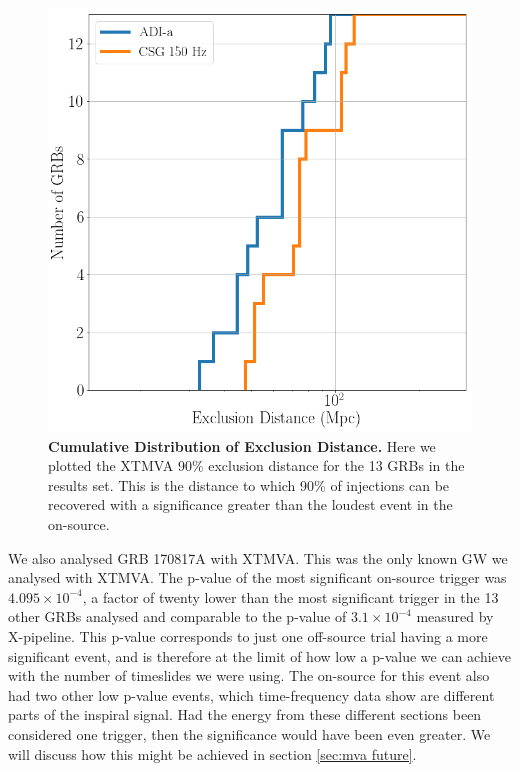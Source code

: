 \documentclass[11pt]{cuthesis}
\newcommand{\xpfs}{X-pipeline. }
\begin{document}
\begin{figure} %
\begin{center}
\includegraphics[width=0.8\linewidth]{mva_exclusion_plot.png}
\end{center}
\caption{\textbf{Cumulative Distribution of Exclusion Distance.} Here we plotted the XTMVA 90\% exclusion distance for the 13 GRBs in the results set. This is the distance to which 90\% of injections can be recovered with a significance greater than the loudest event in the on-source. }
\label{fig:mva exclusion plot}
\end{figure}

We also analysed GRB 170817A with XTMVA. This was the only known GW we analysed with XTMVA. The p-value of the most significant on-source trigger was $4.095\times10^{-4}$, a factor of twenty lower than the most significant trigger in the 13 other GRBs analysed and comparable to the p-value of $3.1\times10^{-4}$ measured by \xpfs This p-value corresponds to just one off-source trial having a more significant event, and is therefore at the limit of how low a p-value we can achieve with the number of timeslides we were using. The on-source for this event also had two other low p-value events, which time-frequency data show are different parts of the inspiral signal. Had the energy from these different sections been considered one trigger, then the significance would have been even greater. We will discuss how this might be achieved in section \ref{sec:mva future}. 
\end{document}
